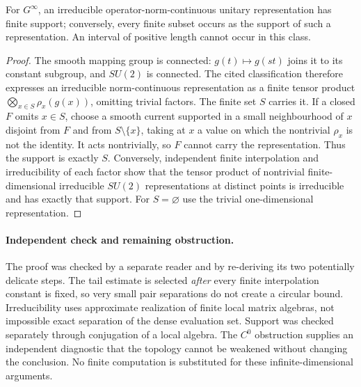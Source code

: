 \begin{corollary}\ours{}
For $G^\infty$, an irreducible operator-norm-continuous unitary
representation has finite support; conversely, every finite subset
occurs as the support of such a representation. An interval of
positive length cannot occur in this class.
\end{corollary}

\begin{proof}
The smooth mapping group is connected: $g(t)\mapsto g(st)$ joins
it to its constant subgroup, and $SU(2)$ is connected.
The cited classification therefore expresses an irreducible
norm-continuous representation as a finite tensor product
$\bigotimes_{x\in S}\rho_x(g(x))$, omitting trivial factors.
The finite set $S$ carries it. If a closed $F$ omits $x\in S$,
choose a smooth current supported in a small neighbourhood of $x$
disjoint from $F$ and from $S\setminus\{x\}$, taking at $x$ a value
on which the nontrivial $\rho_x$ is not the identity. It acts
nontrivially, so $F$ cannot carry the representation. Thus the
support is exactly $S$. Conversely, independent finite
interpolation and irreducibility of each factor show that the
tensor product of nontrivial finite-dimensional irreducible
$SU(2)$ representations at distinct points is irreducible and
has exactly that support. For $S=\varnothing$ use the trivial
one-dimensional representation.
\end{proof}

\paragraph{Independent check and remaining obstruction.}
The proof was checked by a separate reader and by re-deriving its
two potentially delicate steps. The tail estimate is selected
\emph{after} every finite interpolation constant is fixed, so very
small pair separations do not create a circular bound. Irreducibility
uses approximate realization of finite local matrix algebras, not
impossible exact separation of the dense evaluation set. Support
was checked separately through conjugation of a local algebra.
The $C^0$ obstruction supplies an independent diagnostic that the
topology cannot be weakened without changing the conclusion.
No finite computation is substituted for these infinite-dimensional
arguments.

